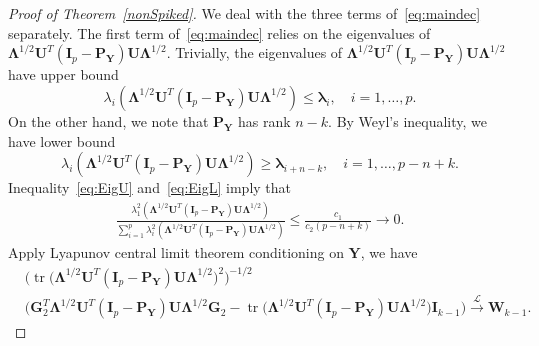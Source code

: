 \documentclass[12pt]{article} %
\DeclareMathOperator{\mytr}{tr}
\newcommand{\bP}{\mathbf{P}}
\newcommand{\bY}{\mathbf{Y}}
\newcommand{\bG}{\mathbf{G}}
\newcommand{\bI}{\mathbf{I}}
\newcommand{\bU}{\mathbf{U}}
\newcommand{\bW}{\mathbf{W}}
\newcommand{\bfsym}[1]{\ensuremath{\boldsymbol{#1}}}
\def\blambda {\bfsym {\lambda}}
\def\bLambda {\bfsym {\Lambda}}
\theoremstyle{definition}
\begin{document}
\begin{proof}[\textrm{Proof of Theorem~\ref{nonSpiked}}]
    We deal with the three terms of~\eqref{eq:maindec} separately.
    The first term of~\eqref{eq:maindec} relies on the eigenvalues of $\bLambda^{1/2}\bU^T (\bI_p-\bP_{\bY})\bU\bLambda^{1/2}$.
    Trivially, the eigenvalues of $\bLambda^{1/2}\bU^T (\bI_p-\bP_{\bY})\bU\bLambda^{1/2}$ have  upper bound
    \begin{equation}\label{eq:EigU}
    \lambda_i (\bLambda^{1/2}\bU^T (\bI_p-\bP_{\bY})\bU\bLambda^{1/2})\leq
        \blambda_i,\quad \text{$i=1,\ldots, p$.}
    \end{equation}
    On the other hand, we note that $\bP_{\bY}$ has rank $n-k$.  By Weyl's inequality, we have lower bound
    \begin{equation}\label{eq:EigL}
    \lambda_i (\bLambda^{1/2}\bU^T (\bI_p-\bP_{\bY})\bU\bLambda^{1/2})\geq
        \blambda_{i+n-k},\quad \text{$i=1,\ldots, p-n+k$}.
    \end{equation}
    Inequality~\eqref{eq:EigU} and~\eqref{eq:EigL} imply that
    $$
    \begin{aligned}
        \frac{\lambda_1^2(\bLambda^{1/2}\bU^T(\bI_p-\bP_{\bY})\bU\bLambda^{1/2})}{\sum_{i=1}^p \lambda_i^2(\bLambda^{1/2}\bU^T(\bI_p-\bP_{\bY})\bU\bLambda^{1/2})}
    \leq
        \frac{c_1}{c_2(p-n+k)}\to 0.
    \end{aligned}
    $$
    Apply Lyapunov central limit theorem conditioning on $\bY$, we have
    \begin{equation}\label{eq:haipa1}
    \begin{aligned}
        &\Big( \mytr\big(\bLambda^{1/2}\bU^T(\bI_p-\bP_{\bY})\bU\bLambda^{1/2}\big)^2\Big)^{-1/2}\\
        &{\Big( \bG_2^T \bLambda^{1/2}\bU^T (\bI_p-\bP_{\bY})\bU\bLambda^{1/2}\bG_2-\mytr\big(\bLambda^{1/2}\bU^T(\bI_p-\bP_{\bY})\bU\bLambda^{1/2}\big)\bI_{k-1}\Big)}
    \xrightarrow{\mathcal{L}} \bW_{k-1}.
    \end{aligned}
    \end{equation}


\end{proof}
\end{document}

